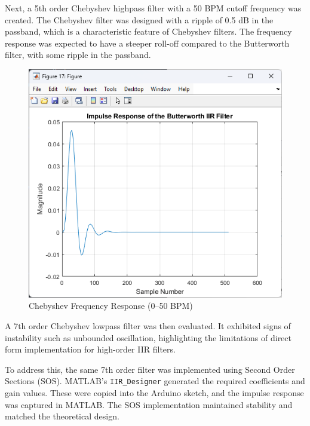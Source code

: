 \documentclass[journal]{IEEEtran}
\begin{document}
Next, a 5th order Chebyshev highpass filter with a 50 BPM cutoff frequency was created. The Chebyshev filter was designed with a ripple of 0.5 dB in the passband, which is a characteristic feature of Chebyshev filters. The frequency response was expected to have a steeper roll-off compared to the Butterworth filter, with some ripple in the passband.

\begin{figure}[H]
    \centering
    \includegraphics[width=\linewidth]{5thOrderChebyImpulse.png}
    \caption{Chebyshev Frequency Response (0–50 BPM)}
    \label{fig:cheby_impulse}
\end{figure}

A 7th order Chebyshev lowpass filter was then evaluated. It exhibited signs of instability such as unbounded oscillation, highlighting the limitations of direct form implementation for high-order IIR filters.

To address this, the same 7th order filter was implemented using Second Order Sections (SOS). MATLAB’s \texttt{IIR\_Designer} generated the required coefficients and gain values. These were copied into the Arduino sketch, and the impulse response was captured in MATLAB. The SOS implementation maintained stability and matched the theoretical design.
\end{document}
